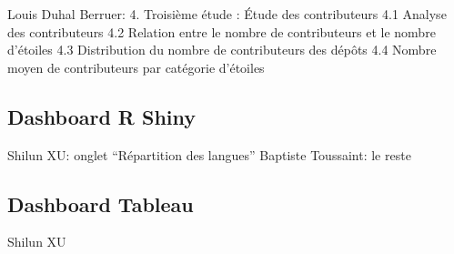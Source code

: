 \documentclass[
]{article}
\begin{document}
Louis Duhal Berruer: 4. Troisième étude : Étude des contributeurs 4.1
Analyse des contributeurs 4.2 Relation entre le nombre de contributeurs
et le nombre d'étoiles 4.3 Distribution du nombre de contributeurs des
dépôts 4.4 Nombre moyen de contributeurs par catégorie d'étoiles

\subsection{Dashboard R Shiny}\label{dashboard-r-shiny}

Shilun XU: onglet ``Répartition des langues'' Baptiste Toussaint: le
reste

\subsection{Dashboard Tableau}\label{dashboard-tableau}

Shilun XU
\end{document}
